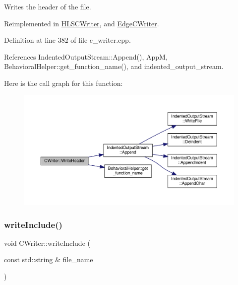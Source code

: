 Writes the header of the file. 



Reimplemented in \hyperlink{classHLSCWriter_ac7015936ef0ed0f6c31f8d7d4c3bd7fa}{H\+L\+S\+C\+Writer}, and \hyperlink{classEdgeCWriter_a8b053256b8c65aca7d7539ebd23537c8}{Edge\+C\+Writer}.



Definition at line 382 of file c\+\_\+writer.\+cpp.



References Indented\+Output\+Stream\+::\+Append(), AppM, Behavioral\+Helper\+::get\+\_\+function\+\_\+name(), and indented\+\_\+output\+\_\+stream.

Here is the call graph for this function\+:
\nopagebreak
\begin{figure}[H]
\begin{center}
\leavevmode
\includegraphics[width=350pt]{d3/d59/classCWriter_a04b8381e64ef2e49ec7cfc308e10e10a_cgraph}
\end{center}
\end{figure}
\mbox{\label{classCWriter_a736e4e43725523bf3775ed54a9044997}} 
\subsubsection{\texorpdfstring{write\+Include()}{writeInclude()}}
{\footnotesize\ttfamily void C\+Writer\+::write\+Include (\begin{DoxyParamCaption}\item[{const std\+::string \&}]{file\+\_\+name }\end{DoxyParamCaption})\hspace{0.3cm}{\ttfamily [virtual]}}



